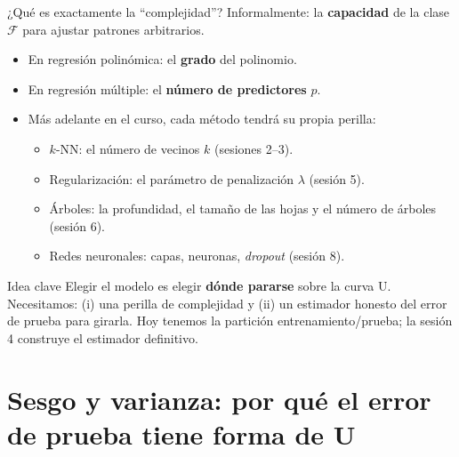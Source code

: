 \documentclass{beamer}
\newcommand{\1}{\mathbb{I}}
\begin{document}
\begin{frame}{¿Qué es exactamente la ``complejidad''?}
\small
Informalmente: la \textbf{capacidad} de la clase $\mathcal{F}$ para ajustar patrones arbitrarios.
\pause
\vspace{0.2cm}
\begin{itemize}\itemsep5pt
  \item En regresión polinómica: el \textbf{grado} del polinomio.
  \item En regresión múltiple: el \textbf{número de predictores} $p$.
  \item Más adelante en el curso, cada método tendrá su propia perilla:
  \begin{itemize}\itemsep3pt
    \item $k$-NN: el número de vecinos $k$ (sesiones 2--3).
    \item Regularización: el parámetro de penalización $\lambda$ (sesión 5).
    \item Árboles: la profundidad, el tamaño de las hojas y el número de árboles (sesión 6).
    \item Redes neuronales: capas, neuronas, \emph{dropout} (sesión 8).
  \end{itemize} \pause
\end{itemize}

\begin{block}{Idea clave}
Elegir el modelo es elegir \textbf{dónde pararse} sobre la curva U. Necesitamos: (i) una perilla de complejidad y (ii) un estimador honesto del error de prueba para girarla. Hoy tenemos la partición entrenamiento/prueba; la sesión 4 construye el estimador definitivo.
\end{block}
\end{frame}


\section{Sesgo y varianza: por qué el error de prueba tiene forma de U}
\begin{frame}[noframenumbering]
\tableofcontents[currentsection]
\end{frame}
\end{document}
